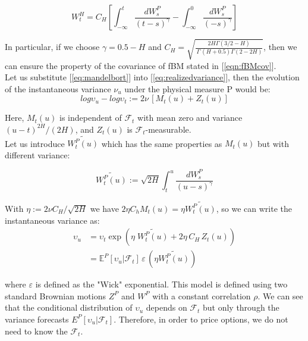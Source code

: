 \documentclass[12pt,oneside]{article}
\begin{document}
\begin{equation}
\label{eq:mandelbort}
    W_{t}^{H} = C_{H} \left[ \int_{-\infty}^{t} \frac{dW_{s}^{P}}{(t-s)^{\gamma}} - \int_{-\infty}^{0} \frac{dW_{s}^{P}}{(-s)^{\gamma}}\right]
\end{equation}

In particular, if we choose $\gamma = 0.5-H$ and $C_{H} = \sqrt{\frac{2H\Gamma(3/2- H)}{\,\Gamma\,(H+0.5) \Gamma(2-2H)}}$, then we can ensure the property of the covariance of fBM stated in [\ref{eqn:fBMcov}].
\\

Let us substitute [\ref{eq:mandelbort}] into [\ref{eq:realizedvariance}], then the evolution of the instantaneous variance $\nu_{u}$ under the physical measure P would be:
\begin{equation}
    log\upsilon_{u} - log\upsilon_{t} := 2  \nu\, [M_{t}(u) + Z_{t}(u)]
\end{equation}

Here, $M_{t}(u)$ is independent of $\mathcal{F}_{t}$ with mean zero and variance $(u-t)^{2H} /(2H)$, and $Z_{t}(u)$ is $\mathcal{F}_{t}$-measurable.
\\

Let us introduce  $\tilde{W_{t}^{P}(u)}$ which has the same properties as $M_{t}(u)$ but with different variance:

\begin{equation}
    \tilde{W_{t}^{P}(u)}:= \sqrt{2H} \int_{t}^{u} \frac{dW_{s}^{P}}{(u-s)^\gamma}
\end{equation}

With $\eta := 2 \nu C_{H}/ \sqrt{2H}$ we have $2\eta C_{h} M_{t}(u) = \eta \tilde{W_{t}^{P}(u)}$, so we can write the instantaneous variance as:
\begin{equation}
\label{eq:volunderP}
\begin{split}
    \upsilon_{u} & = \upsilon_{t} \exp{(\eta\; \tilde{W_{t}^{P}(u)} + 2\eta\,C_{H}\,Z_{t}(u))} \\
    & = \mathbb{E}^{P} [\upsilon_{u}| \mathcal{F}_{t}] \,\varepsilon\, (\eta \tilde{W_{t}^{P}(u)})
\end{split}
\end{equation}
 
 where $\varepsilon$ is defined as the "Wick" exponential. This model is defined using two standard Brownian motions $Z^{P}$ and $W^{P}$ with a constant correlation $\rho$. We can see that the conditional distribution of $\upsilon_{u}$ depends on $\mathcal{F}_{t}$ but only through the variance forecasts $E^{P} [\upsilon_{u}| \mathcal{F}_{t}]$. Therefore, in order to price options, we do not need to know the $\mathcal{F}_{t}$.
\\
\end{document}
